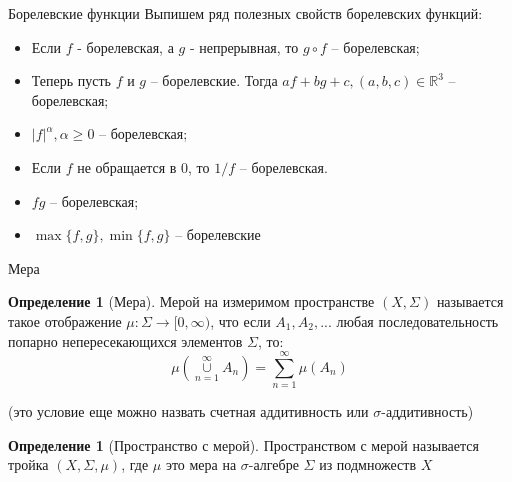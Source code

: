 \documentclass{beamer}%
\theoremstyle{definition}
\newtheorem{mydef}[theorem]{Определение}
\begin{document}
\begin{frame}{Борелевские функции}
Выпишем ряд полезных свойств борелевских функций:

\begin{itemize}
    \item Если $f$ - борелевская, а $g$ - непрерывная, то $g \circ f$ -- борелевская;
    \item Теперь пусть $f$ и $g$ -- борелевские. Тогда $af + bg + c, (a, b, c) \in \mathbb{R}^3$ -- борелевская;
    \item $|f|^{\alpha}, \alpha \geq 0$ -- борелевская;
    \item Если $f$ не обращается в $0$, то $1/f$ -- борелевская.
    \item $fg$ -- борелевская;
    \item $\max\{f, g\}, \min\{f, g\}$ -- борелевские
\end{itemize}





\end{frame}

\begin{frame}{Мера}

\begin{mydef}[Мера]
    Мерой на измеримом пространстве  $(X, \Sigma)$ называется такое отображение $\mu: \Sigma \rightarrow [0, \infty)$, что если $A_1, A_2, ...$ любая последовательность попарно непересекающихся элементов $\Sigma$, то:
        \[\mu(\cup\limits_{n=1}^{\infty} A_n) = \sum\limits_{n=1}^{\infty}\mu(A_n)\]
    
    (это условие еще можно назвать счетная аддитивность или $\sigma$-аддитивность)
\end{mydef}

\begin{mydef}[Пространство с мерой]
    Пространством с мерой называется тройка $(X, \Sigma, \mu)$, 
    где $\mu$ это мера на $\sigma$-алгебре $\Sigma$ из подмножеств $X$
    
\end{mydef}

\end{frame}
\end{document}
